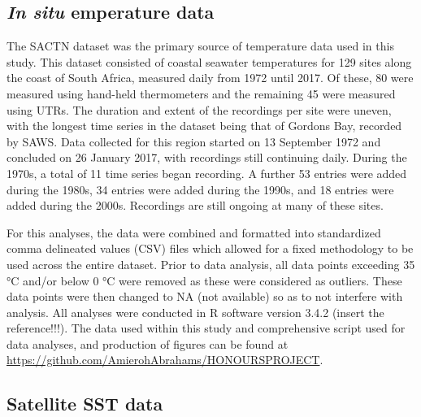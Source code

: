 \documentclass[12pt,a4paper,]{article}
\begin{document}
\hypertarget{in-situ-emperature-data}{%
\subsection{\texorpdfstring{\emph{In situ} emperature
data}{In situ emperature data}}\label{in-situ-emperature-data}}

The SACTN dataset was the primary source of temperature data used in
this study. This dataset consisted of coastal seawater temperatures for
129 sites along the coast of South Africa, measured daily from 1972
until 2017. Of these, 80 were measured using hand-held thermometers and
the remaining 45 were measured using UTRs. The duration and extent of
the recordings per site were uneven, with the longest time series in the
dataset being that of Gordons Bay, recorded by SAWS. Data collected for
this region started on 13 September 1972 and concluded on 26 January
2017, with recordings still continuing daily. During the 1970s, a total
of 11 time series began recording. A further 53 entries were added
during the 1980s, 34 entries were added during the 1990s, and 18 entries
were added during the 2000s. Recordings are still ongoing at many of
these sites.

For this analyses, the data were combined and formatted into
standardized comma delineated values (CSV) files which allowed for a
fixed methodology to be used across the entire dataset. Prior to data
analysis, all data points exceeding 35 °C and/or below 0 °C were removed
as these were considered as outliers. These data points were then
changed to NA (not available) so as to not interfere with analysis. All
analyses were conducted in R software version 3.4.2 (insert the
reference!!!). The data used within this study and comprehensive script
used for data analyses, and production of figures can be found at
\url{https://github.com/AmierohAbrahams/HONOURSPROJECT}.

\hypertarget{satellite-sst-data}{%
\subsection{Satellite SST data}\label{satellite-sst-data}}
\end{document}
